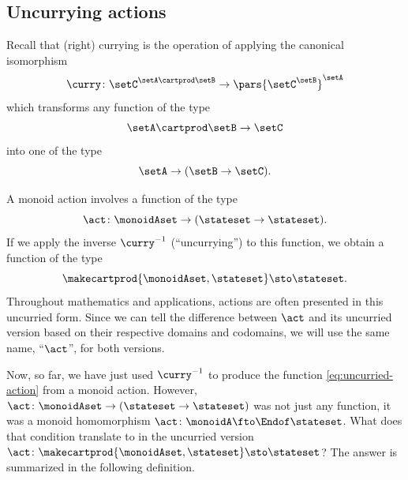 




\subsection{Uncurrying actions}

Recall that (right) currying is the operation of applying the canonical isomorphism
\begin{equation}
    \curry \colon \setC^{\setA \cartprod \setB} \to \pars{\setC^\setB}^\setA
\end{equation}
which transforms any function of the type
\begin{equation}
    \setA \cartprod \setB \to \setC
\end{equation}
into one of the type
\begin{equation}
   \setA \to (\setB \to \setC).
\end{equation}

A monoid action involves a function of the type
\begin{equation}
     \act \colon  \monoidAset \to (\stateset \to \stateset).
\end{equation}
If we apply the inverse $\curry^{-1}$ (``uncurrying'') to this function, 
we obtain a function of the type
\begin{equation}\label{eq:uncurried-action}
 \makecartprod{\monoidAset, \stateset} \sto \stateset.
 \end{equation}
Throughout mathematics and applications, actions are often presented in this uncurried form. 
Since we can tell the difference between $\act$ and its uncurried version based on their respective domains and codomains, we will use the same name, ``$\act$'', for both versions.


Now, so far, we have just used $\curry^{-1}$ to produce the function \cref{eq:uncurried-action} from a monoid action. However, $\act \colon  \monoidAset \to (\stateset \to \stateset)$ was not just any function, it was a monoid homomorphism $\act \colon \monoidA \fto \Endof\stateset$. What does that condition translate to in the uncurried version $\act \colon  \makecartprod{\monoidAset, \stateset} \sto \stateset$? The answer is summarized in the following definition.

